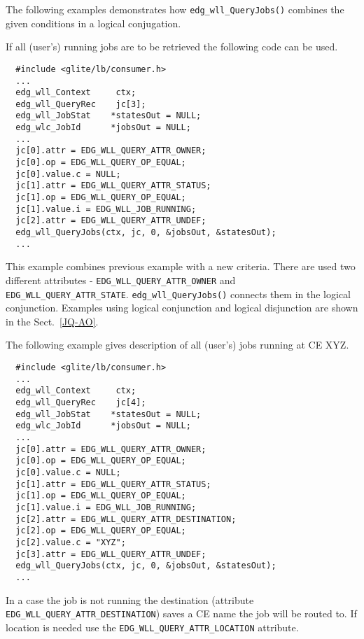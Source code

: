 \par

The following examples demonstrates how \texttt{edg\_wll\_QueryJobs()} combines 
the given conditions in a logical conjugation.

\label{JQ-rj}

If all (user's) running jobs are to be retrieved the following code can
be used.
\begin{verbatim}
  #include <glite/lb/consumer.h>
  ...
  edg_wll_Context     ctx;    
  edg_wll_QueryRec    jc[3];
  edg_wll_JobStat    *statesOut = NULL;
  edg_wlc_JobId      *jobsOut = NULL;
  ...
  jc[0].attr = EDG_WLL_QUERY_ATTR_OWNER;
  jc[0].op = EDG_WLL_QUERY_OP_EQUAL;
  jc[0].value.c = NULL;
  jc[1].attr = EDG_WLL_QUERY_ATTR_STATUS;
  jc[1].op = EDG_WLL_QUERY_OP_EQUAL;
  jc[1].value.i = EDG_WLL_JOB_RUNNING;
  jc[2].attr = EDG_WLL_QUERY_ATTR_UNDEF;
  edg_wll_QueryJobs(ctx, jc, 0, &jobsOut, &statesOut);
  ...
\end{verbatim}

This example combines previous example with a new criteria. There are used two different attributes
 - \texttt{EDG\_WLL\_QUERY\_ATTR\_OWNER} and \texttt{EDG\_WLL\_QUERY\_ATTR\_STATE}.
\texttt{edg\_wll\_QueryJobs()} connects them in the logical conjunction.
Examples using logical conjunction and logical disjunction are shown in the Sect.~\ref{JQ-AO}.

The following example gives description of all (user's) jobs running at CE XYZ.
\begin{verbatim}
  #include <glite/lb/consumer.h>
  ...
  edg_wll_Context     ctx;    
  edg_wll_QueryRec    jc[4];
  edg_wll_JobStat    *statesOut = NULL;
  edg_wlc_JobId      *jobsOut = NULL;
  ...
  jc[0].attr = EDG_WLL_QUERY_ATTR_OWNER;
  jc[0].op = EDG_WLL_QUERY_OP_EQUAL;
  jc[0].value.c = NULL;
  jc[1].attr = EDG_WLL_QUERY_ATTR_STATUS;
  jc[1].op = EDG_WLL_QUERY_OP_EQUAL;
  jc[1].value.i = EDG_WLL_JOB_RUNNING;
  jc[2].attr = EDG_WLL_QUERY_ATTR_DESTINATION;
  jc[2].op = EDG_WLL_QUERY_OP_EQUAL;
  jc[2].value.c = "XYZ";
  jc[3].attr = EDG_WLL_QUERY_ATTR_UNDEF;
  edg_wll_QueryJobs(ctx, jc, 0, &jobsOut, &statesOut);
  ...
\end{verbatim}

In a case the job is not running the destination (attribute \texttt{EDG\_WLL\_QUERY\_ATTR\_DESTINATION})
saves a CE name the job will be routed to. If location is needed use the \texttt{EDG\_WLL\_QUERY\_ATTR\_LOCATION} attribute.


